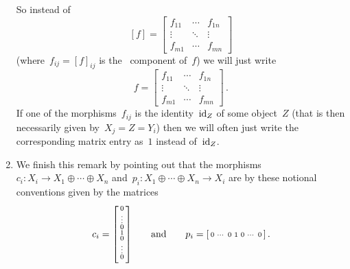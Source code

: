 \begin{remark*}
\begin{enumerate}
      So instead of
      \[
          [f]
        = \begin{bmatrix}
            f_{11}  & \cdots  & f_{1n}  \\
            \vdots  & \ddots  & \vdots  \\
            f_{m1}  & \cdots  & f_{mn}
          \end{bmatrix}
      \]
      (where~$f_{ij} = [f]_{ij}$ is the~ component of~$f$) we will just write
      \[
          f
        = \begin{bmatrix}
            f_{11}  & \cdots  & f_{1n}  \\
            \vdots  & \ddots  & \vdots  \\
            f_{m1}  & \cdots  & f_{mn}
          \end{bmatrix} \,.
      \]
      If one of the morphisms~$f_{ij}$ is the identity~$\operatorname{id}_Z$ of some object~$Z$ (that is then necessarily given by~$X_j = Z = Y_i$) then we will often just write the corresponding matrix entry as~$1$ instead of~$\operatorname{id}_Z$.
    \item
      We finish this remark by pointing out that the morphisms~$c_i \colon X_i \to X_1 \oplus \dotsb \oplus X_n$ and~$p_i \colon X_1 \oplus \dotsb \oplus X_n \to X_i$ are by these notional conventions given by the matrices
      \[
          c_i
        = \begin{bsmallmatrix}
            {} \\0 \\ \vdots \\ 0 \\ 1 \\ 0 \\ \vdots \\ 0 \\ {}
          \end{bsmallmatrix}
        \qquad\text{and}\qquad
          p_i
        = \begin{bsmallmatrix}
            0 & \cdots & 0 & 1 & 0 & \cdots & 0
          \end{bsmallmatrix} \,.
      \]
  \end{enumerate}
\end{remark*}


